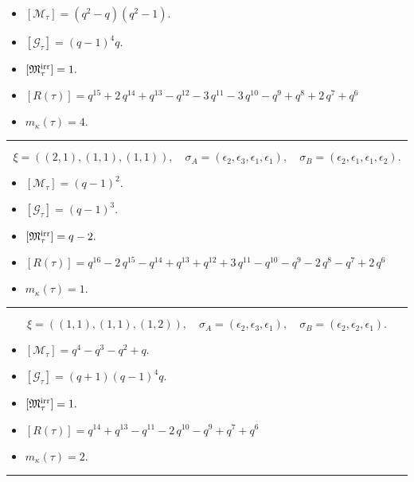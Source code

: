 \documentclass[10pt,a4paper]{amsart}
\begin{document}
\begin{itemize}
 \item $[\mathcal{M}_{\tau}] = {\left(q^{2} - q\right)} {\left(q^{2} - 1\right)} .$

 \item $[\mathcal{G}_{\tau}] = {\left(q - 1\right)}^{4} q .$

 \item $[{\frak M}_{\tau}^{\textrm{irr}}] = 1 .$

 \item $[R(\tau)] = q^{15} + 2 \, q^{14} + q^{13} - q^{12} - 3 \, q^{11} - 3 \, q^{10} - q^{9} + q^{8} + 2 \, q^{7} + q^{6} $

 \item $m_{\kappa}(\tau) = 4 .$

 \end{itemize}
\noindent\rule{8cm}{0.4pt}

$$\xi = ({(2, 1)}, {(1, 1), (1, 1)}),\quad \sigma_A = ({{\epsilon_2, \epsilon_3}}, {{\epsilon_1}, {\epsilon_1}}),\quad \sigma_B = ({{\epsilon_2, \epsilon_1}}, {{\epsilon_1}, {\epsilon_2}}).$$

\begin{itemize}
 \item $[\mathcal{M}_{\tau}] = {\left(q - 1\right)}^{2} .$

 \item $[\mathcal{G}_{\tau}] = {\left(q - 1\right)}^{3} .$

 \item $[{\frak M}_{\tau}^{\textrm{irr}}] = q - 2 .$

 \item $[R(\tau)] = q^{16} - 2 \, q^{15} - q^{14} + q^{13} + q^{12} + 3 \, q^{11} - q^{10} - q^{9} - 2 \, q^{8} - q^{7} + 2 \, q^{6} $

 \item $m_{\kappa}(\tau) = 1 .$

 \end{itemize}
\noindent\rule{8cm}{0.4pt}

$$\xi = ({(1, 1), (1, 1)}, {(1, 2)}),\quad \sigma_A = ({{\epsilon_2}, {\epsilon_3}}, {{\epsilon_1}}),\quad \sigma_B = ({{\epsilon_2}, {\epsilon_2}}, {{\epsilon_1}}).$$

\begin{itemize}
 \item $[\mathcal{M}_{\tau}] = q^{4} - q^{3} - q^{2} + q .$

 \item $[\mathcal{G}_{\tau}] = {\left(q + 1\right)} {\left(q - 1\right)}^{4} q .$

 \item $[{\frak M}_{\tau}^{\textrm{irr}}] = 1 .$

 \item $[R(\tau)] = q^{14} + q^{13} - q^{11} - 2 \, q^{10} - q^{9} + q^{7} + q^{6} $

 \item $m_{\kappa}(\tau) = 2 .$

 \end{itemize}
\noindent\rule{8cm}{0.4pt}
\end{document}
